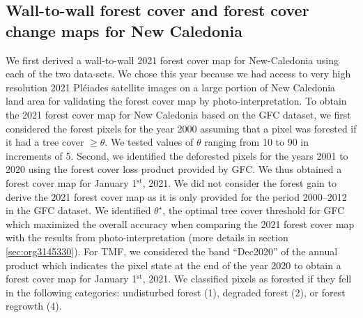 \documentclass[paper=a4, fontsize=12pt, DIV=13, english, dvipsnames]{scrartcl}
\begin{document}
\subsection{Wall-to-wall forest cover and forest cover change maps for New Caledonia}
\label{sec:org9aca491}
We first derived a wall-to-wall 2021 forest cover map for New-Caledonia using each of the two data-sets. We chose this year because we had access to very high resolution 2021 Pléiades satellite images on a large portion of New Caledonia land area for validating the forest cover map by photo-interpretation. To obtain the 2021 forest cover map for New Caledonia based on the GFC dataset, we first considered the forest pixels for the year 2000 assuming that a pixel was forested if it had a tree cover \(\geq \theta\). We tested values of \(\theta\) ranging from 10 to 90 in increments of 5. Second, we identified the deforested pixels for the years 2001 to 2020 using the forest cover loss product provided by GFC. We thus obtained a forest cover map for January 1\(^{\text{st}}\), 2021. We did not consider the forest gain to derive the 2021 forest cover map as it is only provided for the period 2000--2012 in the GFC dataset. We identified \(\theta^{\star}\), the optimal tree cover threshold for GFC which maximized the overall accuracy when comparing the 2021 forest cover map with the results from photo-interpretation (more details in section \ref{sec:org3145330}). For TMF, we considered the band ``Dec2020'' of the annual product which indicates the pixel state at the end of the year 2020 to obtain a forest cover map for January 1\(^{\text{st}}\), 2021. We classified pixels as forested if they fell in the following categories: undisturbed forest (1), degraded forest (2), or forest regrowth (4).
\end{document}
